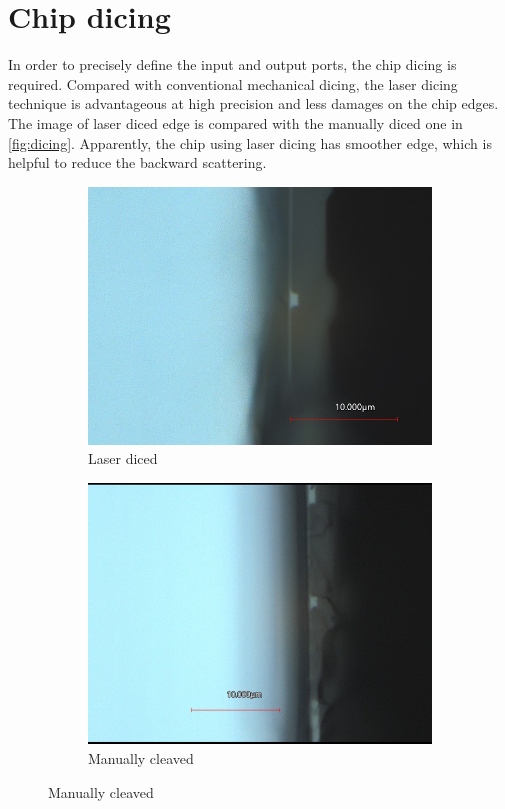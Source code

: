 \section{Chip dicing}\label{sec:chip-dicing}



In order to precisely define the input and output ports, the chip dicing is required.
Compared with conventional mechanical dicing,  the laser dicing technique is advantageous at high precision and less damages on the chip edges. The image of laser diced edge is compared with the manually diced one in \autoref{fig:dicing}. Apparently, the chip using laser dicing has smoother edge, which is helpful to reduce the backward scattering.

\begin{figure}
    \centering
	\begin{subfigure}[b]{0.45\textwidth}
		\includegraphics[width=\textwidth]{imgs/jpg/laser}
 		\caption{Laser diced}
	\end{subfigure}
	\begin{subfigure}[b]{0.45\textwidth}
		\includegraphics[width=\textwidth]{imgs/jpg/manual_cleav}
 		\caption{Manually cleaved}
	\end{subfigure}
    \label{fig:dicing}
\end{figure}


